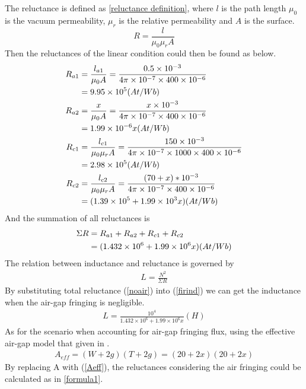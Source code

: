 \documentclass[a4paper]{IEEEtran}
\begin{document}
The reluctance is defined as \eqref{reluctance definition}, where $l$ is the path length
$\mu_0$ is the vacuum permeability, $\mu_r$ is the relative permeability and $A$ is the surface.
\begin{equation}
  R = \frac{l}{\mu_0 \mu_r A}\label{reluctance definition}
\end{equation} 
Then the reluctances of the linear condition could then be found as below.
\begin{align}
	R_{a1} &= \frac{l_{a1}}{\mu_0 A} = \frac{0.5\times10^{-3}}{4\pi\times10^{-7}\times 400\times 10^{-6}}\notag\\ &= 9.95\times10^{5}(At/Wb)\\
	R_{a2} &= \frac{x}{\mu_0 A} = \frac{x\times 10^{-3}}{4\pi\times 10^{-7}\times 400\times 10^{-6}}\notag\\ &= 1.99\times 10^{-6}x(At/Wb)\\
	R_{c1} &= \frac{l_{c1}}{\mu_0\mu_rA} = \frac{150\times10^{-3}}{4\pi\times 10^{-7}\times 1000\times 400\times 10^{-6}}\notag\\ &= 2.98\times 10^{5} (At/Wb)\\
	R_{c2} &= \frac{l_{c2}}{\mu_0\mu_rA} = \frac{(70 + x) *10^{-3}}{4\pi\times10^{-7}\times 400\times 10^{-6}}\notag\\ &= (1.39\times 10^5 + 1.99\times 10^3x)(At/Wb)
\end{align}
And the summation of all reluctances is 
\begin{align}
	\Sigma R &= R_{a1} + R_{a2} + R_{c1} + R_{c2}\notag\\
	 &= (1.432\times 10^6 + 1.99\times 10^6x) (At/Wb) \label{noair}
\end{align}
The relation between inductance and reluctance is governed by
\begin{align}
	L = \frac{N^2}{\Sigma R} \label{firind}
\end{align} 
By substituting total reluctance (\ref{noair}) into (\ref{firind}) we can get the inductance when the air-gap fringing is negligible.
\begin{align}
	L = \frac{10^4}{1.432\times 10^6 + 1.99\times 10^6x} (H) \label{inductance not considering aeff}
\end{align}
As for the scenario when accounting for air-gap fringing flux, using the effective air-gap model that given in \cite{notes_course}.
\begin{align}
	A_{eff} = (W+2g)(T+2g) = (20+2x)(20+2x)\label{Aeff}
\end{align}
By replacing A with (\ref{Aeff}), the reluctances considering the air fringing could be calculated as in \eqref{formula1}.
\end{document}

